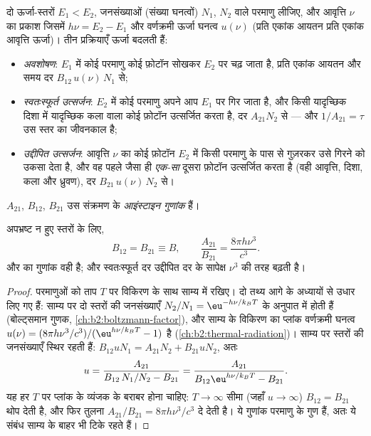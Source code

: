 \begin{definition}[अवशोषण, स्वतःस्फूर्त और उद्दीपित उत्सर्जन]\label{def:b2:laser:processes}
दो ऊर्जा-स्तरों $E_1 < E_2$, जनसंख्याओं (संख्या
घनत्वों) $N_1$, $N_2$ वाले परमाणु लीजिए, और आवृत्ति $\nu$ का प्रकाश जिसमें
$h\nu = E_2 - E_1$ और वर्णक्रमी ऊर्जा घनत्व $u(\nu)$ (प्रति एकांक
आयतन प्रति एकांक आवृत्ति ऊर्जा)। तीन प्रक्रियाएँ ऊर्जा बदलती हैं:
\begin{itemize}
\item \emph{अवशोषण}: $E_1$ में कोई परमाणु
      कोई फ़ोटॉन सोखकर $E_2$ पर चढ़ जाता है, प्रति एकांक आयतन और समय
      दर $B_{12}\,u(\nu)\,N_1$ से;
\item \emph{स्वतःस्फूर्त उत्सर्जन}: $E_2$ में
      कोई परमाणु अपने आप $E_1$ पर गिर जाता है, और किसी यादृच्छिक
      दिशा में यादृच्छिक कला वाला कोई फ़ोटॉन उत्सर्जित करता है, दर $A_{21}N_2$ से ---
      और $1/A_{21} = \tau$ उस स्तर का जीवनकाल है;
\item \emph{उद्दीपित उत्सर्जन}: आवृत्ति $\nu$
      का कोई फ़ोटॉन $E_2$ में किसी परमाणु के पास से गुज़रकर उसे गिरने को
      उकसा देता है, और वह पहले जैसा ही \emph{एक-सा} दूसरा फ़ोटॉन उत्सर्जित करता है (वही
      आवृत्ति, दिशा, कला और ध्रुवण), दर
      $B_{21}\,u(\nu)\,N_2$ से।
\end{itemize}
$A_{21}$, $B_{12}$, $B_{21}$ उस संक्रमण के \emph{आइंस्टाइन
गुणांक} हैं।
\end{definition}

\begin{proposition}[आइंस्टाइन संबंध]\label{prop:b2:laser:einstein}
अपभ्रष्ट न हुए स्तरों के लिए,
\[
B_{12} = B_{21} \equiv B, \qquad
\frac{A_{21}}{B_{21}} = \frac{8\pi h\nu^3}{c^3}.
\]
 और  का गुणांक वही है; और
स्वतःस्फूर्त दर उद्दीपित दर के सापेक्ष $\nu^3$ की तरह बढ़ती है।
\end{proposition}

\begin{proof}
परमाणुओं को ताप $T$ पर विकिरण के साथ साम्य में रखिए। दो
तथ्य आगे के अध्यायों से उधार लिए गए हैं: साम्य पर दो स्तरों की जनसंख्याएँ
$N_2/N_1 = \eu^{-h\nu/k_BT}$ के अनुपात में होती हैं (बोल्ट्समान
गुणक, \cref{ch:b2:boltzmann-factor}), और साम्य के
विकिरण का प्लांक वर्णक्रमी घनत्व
$u(\nu) = (8\pi h\nu^3/c^3)/(\eu^{h\nu/k_BT} - 1)$ है
(\cref{ch:b2:thermal-radiation})। साम्य पर स्तरों की जनसंख्याएँ
स्थिर रहती हैं: $B_{12}uN_1 = A_{21}N_2 + B_{21}uN_2$, अतः
\[
u = \frac{A_{21}}{B_{12}\,N_1/N_2 - B_{21}}
  = \frac{A_{21}}{B_{12}\eu^{h\nu/k_BT} - B_{21}}.
\]
यह हर $T$ पर प्लांक के व्यंजक के बराबर होना चाहिए: $T \to \infty$
सीमा (जहाँ $u \to \infty$) $B_{12} = B_{21}$ थोप देती है, और
फिर तुलना $A_{21}/B_{21} = 8\pi h\nu^3/c^3$ दे देती है। ये
गुणांक परमाणु के गुण हैं, अतः ये संबंध साम्य के बाहर भी
टिके रहते हैं।
\end{proof}

